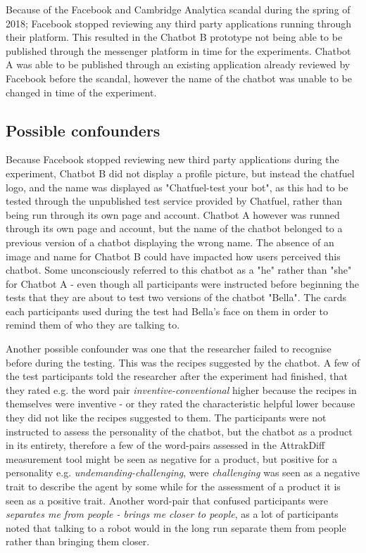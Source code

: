 Because of the Facebook and Cambridge Analytica scandal during the spring of 2018; Facebook stopped reviewing any third party applications running through their platform. This resulted in the Chatbot B prototype not being able to be published through the messenger platform in time for the experiments. Chatbot A was able to be published through an existing application already reviewed by Facebook before the scandal, however the name of the chatbot was unable to be changed in time of the experiment.

\subsection{Possible confounders}
Because Facebook stopped reviewing new third party applications during the experiment, Chatbot B did not display a profile picture, but instead the chatfuel logo, and the name was displayed as "Chatfuel-test your bot", as this had to be tested through the unpublished test service provided by Chatfuel, rather than being run through its own page and account. Chatbot A however was runned through its own page and account, but the name of the chatbot belonged to a previous version of a chatbot displaying the wrong name. The absence of an image and name for Chatbot B could have impacted how users perceived this chatbot. Some unconsciously referred to this chatbot as a "he" rather than "she" for Chatbot A - even though all participants were instructed before beginning the tests that they are about to test two versions of the chatbot "Bella". The cards each participants used during the test had Bella's face on them in order to remind them of who they are talking to. 

Another possible confounder was one that the researcher failed to recognise before during the testing. This was the recipes suggested by the chatbot. A few of the test participants told the researcher after the experiment had finished, that they rated e.g. the word pair \textit{inventive-conventional} higher because the recipes in themselves were inventive - or they rated the characteristic helpful lower because they did not like the recipes suggested to them. The participants were not instructed to assess the personality of the chatbot, but the chatbot as a product in its entirety, therefore a few of the word-pairs assessed in the AttrakDiff measurement tool might be seen as negative for a product, but positive for a personality e.g. \textit{undemanding-challenging}, were \textit{challenging} was seen as a negative trait to describe the agent by some while for the assessment of a product it is seen as a positive trait. Another word-pair that confused participants were \textit{separates me from people - brings me closer to people}, as a lot of participants noted that talking to a robot would in the long run separate them from people rather than bringing them closer.


